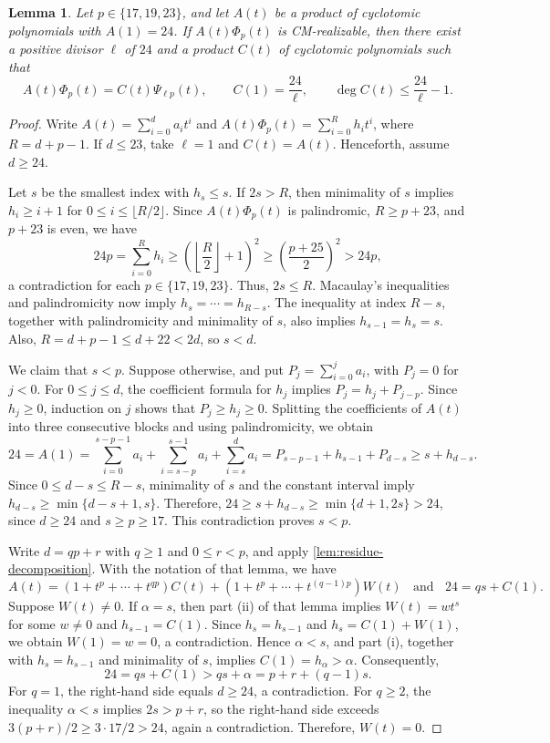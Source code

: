 \documentclass[11pt,a4paper]{amsart}
\newtheorem{lemma}[lemma]{Lemma}
\theoremstyle{definition}
\theoremstyle{remark}
\begin{document}
\begin{lemma}\label{lem:24p-phi-p-reduction}
Let $p\in\{17,19,23\}$, and let $A(t)$ be a product of cyclotomic polynomials with $A(1)=24$. If $A(t)\Phi_p(t)$ is CM-realizable, then there exist a positive divisor $\ell$ of $24$ and a product $C(t)$ of cyclotomic polynomials such that
\[A(t)\Phi_p(t)=C(t)\Psi_{\ell p}(t),\qquad C(1)=\frac{24}{\ell},\qquad\deg C(t)\le\frac{24}{\ell}-1.\]
\end{lemma}
\begin{proof}
Write $A(t)=\sum_{i=0}^d a_it^i$ and $A(t)\Phi_p(t)=\sum_{i=0}^R h_it^i$, where $R=d+p-1$. If $d\le23$, take $\ell=1$ and $C(t)=A(t)$. Henceforth, assume $d\ge24$.

Let $s$ be the smallest index with $h_s\le s$. If $2s>R$, then minimality of $s$ implies $h_i\ge i+1$ for $0\le i\le\lfloor R/2\rfloor$. Since $A(t)\Phi_p(t)$ is palindromic, $R\ge p+23$, and $p+23$ is even, we have
\[24p=\sum_{i=0}^R h_i\ge\left(\left\lfloor\frac R2\right\rfloor+1\right)^2\ge\left(\frac{p+25}{2}\right)^2>24p,\]
a contradiction for each $p\in\{17,19,23\}$. Thus, $2s\le R$. Macaulay's inequalities and palindromicity now imply $h_s=\cdots=h_{R-s}$. The inequality at index $R-s$, together with palindromicity and minimality of $s$, also implies $h_{s-1}=h_s=s$. Also, $R=d+p-1 \leq d+22 <2d$, so $s<d$.

We claim that $s<p$. Suppose otherwise, and put $P_j=\sum_{i=0}^j a_i$, with $P_j=0$ for $j<0$. For $0\le j\le d$, the coefficient formula for $h_j$ implies $P_j=h_j+P_{j-p}$. Since $h_j\ge0$, induction on $j$ shows that $P_j\ge h_j\ge0$. Splitting the coefficients of $A(t)$ into three consecutive blocks and using palindromicity, we obtain
\[24=A(1)=\sum_{i=0}^{s-p-1}a_i+\sum_{i=s-p}^{s-1}a_i+\sum_{i=s}^d a_i=P_{s-p-1}+h_{s-1}+P_{d-s}\ge s+h_{d-s}.\]
Since $0\le d-s\le R-s$, minimality of $s$ and the constant interval imply $h_{d-s}\ge\min\{d-s+1,s\}$. Therefore, $24\ge s+h_{d-s}\ge\min\{d+1,2s\}>24$, since $d\ge24$ and $s\ge p\ge17$. This contradiction proves $s<p$.

Write $d=qp+r$ with $q\ge1$ and $0\le r<p$, and apply \cref{lem:residue-decomposition}. With the notation of that lemma, we have
\[A(t)=(1+t^p+\cdots+t^{qp})C(t)+(1+t^p+\cdots+t^{(q-1)p})W(t) \;\;\text{ and }\;\; 24=qs+C(1).\]
Suppose $W(t)\ne0$. If $\alpha=s$, then part \textup{(ii)} of that lemma implies $W(t)=wt^s$ for some $w\ne0$ and $h_{s-1}=C(1)$. Since $h_s=h_{s-1}$ and $h_s=C(1)+W(1)$, we obtain $W(1)=w=0$, a contradiction. Hence $\alpha<s$, and part \textup{(i)}, together with $h_s=h_{s-1}$ and minimality of $s$, implies $C(1)=h_\alpha>\alpha$. Consequently,
\[24=qs+C(1)>qs+\alpha=p+r+(q-1)s.\]
For $q=1$, the right-hand side equals $d\ge24$, a contradiction. For $q\ge2$, the inequality $\alpha<s$ implies $2s>p+r$, so the right-hand side exceeds $3(p+r)/2\ge3\cdot17/2>24$, again a contradiction. Therefore, $W(t)=0$.


\end{proof}
\end{document}
